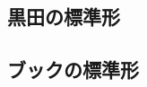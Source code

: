 \documentclass[a4paper]{jarticle}
\begin{document}
\begin{comment}
\begin{itembox}[l]{置き換え処理1}
\end{itembox}
\begin{proof}
\end{proof}
\end{comment}
\subsection{黒田の標準形}
\subsection{ブックの標準形}
\end{document}
